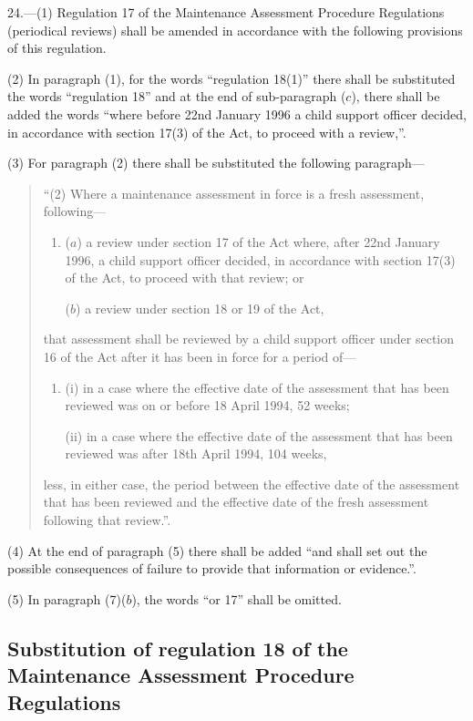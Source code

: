 \documentclass[12pt,a4paper]{article}
\begin{document}
24.—(1) Regulation 17 of the Maintenance Assessment Procedure Regulations (periodical reviews) shall be amended in accordance with the following provisions of this regulation.

(2) In paragraph (1), for the words “regulation 18(1)” there shall be substituted the words “regulation 18” and at the end of sub-paragraph ($c$), there shall be added the words “where before 22nd January 1996 a child support officer decided, in accordance with section 17(3) of the Act, to proceed with a review,”.

(3) For paragraph (2) there shall be substituted the following paragraph—
\begin{quotation}
“(2) Where a maintenance assessment in force is a fresh assessment, following—
\begin{enumerate}\item[]
($a$) a review under section 17 of the Act where, after 22nd January 1996, a child support officer decided, in accordance with section 17(3) of the Act, to proceed with that review; or

($b$) a review under section 18 or 19 of the Act,
\end{enumerate}
that assessment shall be reviewed by a child support officer under section 16 of the Act after it has been in force for a period of—
\begin{enumerate}\item[]
(i) in a case where the effective date of the assessment that has been reviewed was on or before 18 April 1994, 52 weeks;

(ii) in a case where the effective date of the assessment that has been reviewed was after 18th April 1994, 104 weeks,
\end{enumerate}
less, in either case, the period between the effective date of the assessment that has been reviewed and the effective date of the fresh assessment following that review.”.
\end{quotation}

(4) At the end of paragraph (5) there shall be added “and shall set out the possible consequences of failure to provide that information or evidence.”.

(5) In paragraph (7)($b$), the words “or 17” shall be omitted.

\subsection[25. Substitution of regulation 18 of the Maintenance Assessment Procedure Regulations]{Substitution of regulation 18 of the Maintenance Assessment Procedure Regulations}
\end{document}

